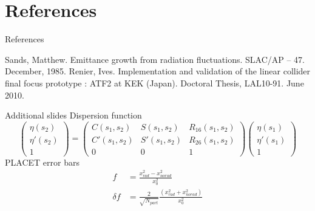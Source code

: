 \documentclass{beamer}
\begin{document}
\section*{References}
\begin{frame}{References}
 \begin{thebibliography}{6}
  Sands, Matthew. Emittance growth from radiation fluctuations. SLAC/AP – 47. December, 1985.
  Renier, Ives. Implementation and validation of the linear collider final focus prototype : ATF2 at KEK (Japan). Doctoral Thesis, LAL10-91. June 2010.
 \end{thebibliography}
\end{frame}
\begin{frame}{Additional slides}
Dispersion function
\begin{equation*}
\begin{pmatrix}
 \eta(s_2)\\
 \eta'(s_2)\\
 1
\end{pmatrix}
=
\begin{pmatrix}
 C(s_1,s_2) & S(s_1,s_2)& R_{16}(s_1,s_2)\\
 C'(s_1,s_2) & S'(s_1,s_2) & R_{26}(s_1,s_2)\\
 0 & 0 &1
 
\end{pmatrix}
\begin{pmatrix}
 \eta(s_1)\\
 \eta'(s_1)\\
 1
\end{pmatrix}
\end{equation*}
PLACET error bars
\begin{align*}
 f&= \frac{x_{rad}^2-x_{norad}^2}{x^2_0}\\
 \delta f &= \frac{2}{\sqrt{N_{part}}}\frac{(x^2_{rad}+x^2_{norad})}{x_0^2}
\end{align*}
\end{frame}
\end{document}
